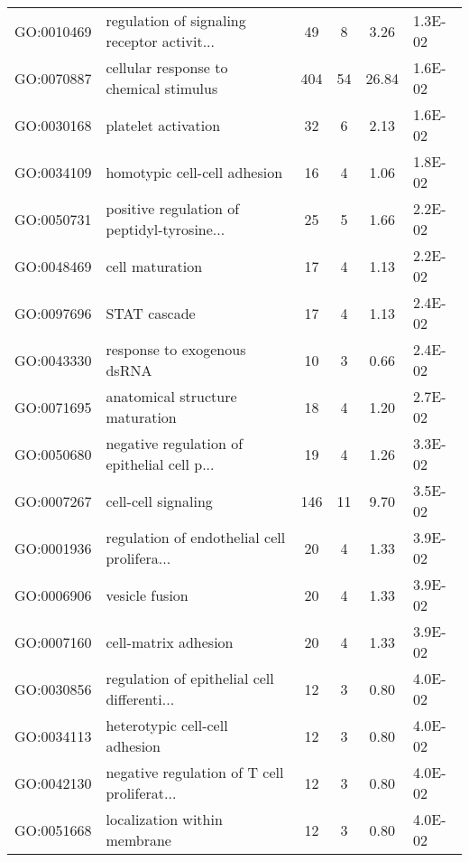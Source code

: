 \begin{table}[ht]
\begin{tabular}{llcccl}
  GO:0010469 & regulation of signaling receptor activit... &  49 &   8 & 3.26 & 1.3E-02 \\ 
  GO:0070887 & cellular response to chemical stimulus & 404 &  54 & 26.84 & 1.6E-02 \\ 
  GO:0030168 & platelet activation &  32 &   6 & 2.13 & 1.6E-02 \\ 
  GO:0034109 & homotypic cell-cell adhesion &  16 &   4 & 1.06 & 1.8E-02 \\ 
  GO:0050731 & positive regulation of peptidyl-tyrosine... &  25 &   5 & 1.66 & 2.2E-02 \\ 
  GO:0048469 & cell maturation &  17 &   4 & 1.13 & 2.2E-02 \\ 
  GO:0097696 & STAT cascade &  17 &   4 & 1.13 & 2.4E-02 \\ 
  GO:0043330 & response to exogenous dsRNA &  10 &   3 & 0.66 & 2.4E-02 \\ 
  GO:0071695 & anatomical structure maturation &  18 &   4 & 1.20 & 2.7E-02 \\ 
  GO:0050680 & negative regulation of epithelial cell p... &  19 &   4 & 1.26 & 3.3E-02 \\ 
  GO:0007267 & cell-cell signaling & 146 &  11 & 9.70 & 3.5E-02 \\ 
  GO:0001936 & regulation of endothelial cell prolifera... &  20 &   4 & 1.33 & 3.9E-02 \\ 
  GO:0006906 & vesicle fusion &  20 &   4 & 1.33 & 3.9E-02 \\ 
  GO:0007160 & cell-matrix adhesion &  20 &   4 & 1.33 & 3.9E-02 \\ 
  GO:0030856 & regulation of epithelial cell differenti... &  12 &   3 & 0.80 & 4.0E-02 \\ 
  GO:0034113 & heterotypic cell-cell adhesion &  12 &   3 & 0.80 & 4.0E-02 \\ 
  GO:0042130 & negative regulation of T cell proliferat... &  12 &   3 & 0.80 & 4.0E-02 \\ 
  GO:0051668 & localization within membrane &  12 &   3 & 0.80 & 4.0E-02 \\ 
   \hline
\end{tabular}
\label{P-value, LFC > 1.4, Absolute}
\end{table}

